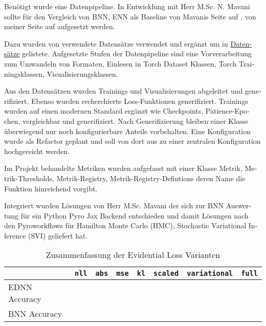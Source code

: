 \begin{otherlanguage}{ngerman}
Benötigt wurde eine Datenpipeline. In Entwicklung mit Herr M.Sc. N. Mavani sollte für den Vergleich von BNN, ENN als Baseline von Mavanis Seite auf \parencite{Depeweg2019}, von meiner Seite auf \parencite{Ulmer2023} aufgesetzt werden.\newline

Dazu wurden von \parencite{Depeweg2019} verwendete Datensätze verwendet und ergänzt um in \hyperref[sec:datensaetze]{Datensätze} gelistete. Aufgesetzte Stufen der Datenpipeline sind eine Vorverarbeitung zum Umwandeln von Formaten, Einlesen in Torch Dataset Klassen, Torch Trainingsklassen, Visualisierungsklassen.\newline

Aus den Datensätzen wurden Trainings und Visualisierungen abgeleitet und generifiziert. Ebenso wurden recherchierte Loss-Funktionen generifiziert. Trainings wurden auf einen modernen Standard ergänzt wie Checkpoints, Patience-Epochen, vergleichbar und generifiziert. Nach Generifizierung bleiben einer Klasse überwiegend nur noch konfigurierbare Anteile vorbehalten. Eine Konfiguration wurde als Refactor geplant und soll von dort aus zu einer zentralen Konfiguration hochgereicht werden.\newline

Im Projekt behandelte Metriken wurden aufgefasst mit einer Klasse Metrik, Metrik-Thresholds, Metrik-Registry, Metrik-Registry-Defintions deren Name die Funktion hinreichend vorgibt.\newline

Integriert wurden Lösungen von Herr M.Sc. Mavani der sich zur BNN Auswertung für ein Python Pyro Jax Backend entschieden und damit Lösungen nach den Pyroworkflows für Hamilton Monte Carlo (HMC), Stochastic Variational Inference (SVI) geliefert hat.



\begin{table}[htbp]
\centering
\begin{tabularx}{\textwidth}{|l|l|l|l|l|l|l|X|}
\hline
 & \texttt{nll} & \texttt{abs} & \texttt{mse} & \texttt{kl} & \texttt{scaled} & \texttt{variational} & \texttt{full} \\
\hline
EDNN Accuracy & & & & & & & \\
\hline
BNN Accuracy & & & & & & & \\
\hline
\end{tabularx}
\caption{Zusammenfassung der Evidential Loss Varianten}
\end{table}


\end{otherlanguage}
